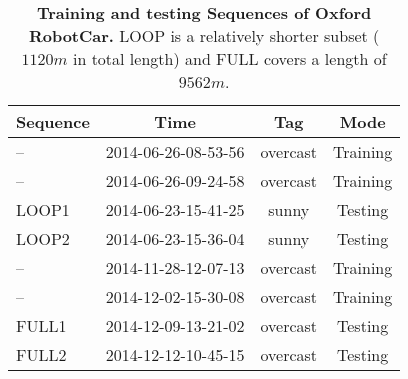 \documentclass[letterpaper]{article}
\begin{document}
\begin{table}[t]
	\centering
	\caption{\textbf{Training and testing Sequences of Oxford RobotCar.} LOOP is a relatively shorter subset ($1120m$ in total length) and FULL covers a length of $9562m$. }
			\begin{tabular}{l|ccc}
				Sequence & Time & Tag &  Mode \\
				\hline
				\hline
				--    & 2014-06-26-08-53-56 & overcast & Training \\
				--    & 2014-06-26-09-24-58 & overcast & Training \\
				LOOP1 & 2014-06-23-15-41-25 & sunny    & Testing  \\
				LOOP2 & 2014-06-23-15-36-04 & sunny    & Testing  \\
				\hline
				--    & 2014-11-28-12-07-13 & overcast & Training \\
				--    & 2014-12-02-15-30-08 & overcast & Training \\
				FULL1 & 2014-12-09-13-21-02 & overcast & Testing  \\
				FULL2 & 2014-12-12-10-45-15 & overcast & Testing  \\
			\end{tabular}
    \vspace{-0.5cm}
	\label{tab:train_test_split}
\end{table}
\end{document}
